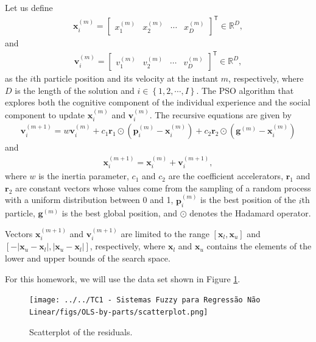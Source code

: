 \documentclass[12pt,a4paper]{article}
\newcommand\abs[1]{\left\lvert#1\right\rvert}
\newcommand{\trans}{\mathsf{T}}
\newcommand{\Real}{\mathbb{R}}
\begin{document}
Let us define
\begin{align}
    \mathbf{x}_i^{(m)} = \begin{bmatrix}
        x_1^{(m)} & x_2^{(m)} & \cdots & x_D^{(m)}
    \end{bmatrix}^\trans \in \Real^D,
\end{align}
and
\begin{align}
    \mathbf{v}_i^{(m)} = \begin{bmatrix}
        v_1^{(m)} & v_2^{(m)} & \cdots & v_D^{(m)}
    \end{bmatrix}^\trans \in \Real^D,
\end{align}
as the \(i\)th particle position and its velocity at the instant \(m\), respectively, where \(D\) is the length of the solution and \(i \in \left\{ 1, 2, \cdots, I \right\}\). The PSO algorithm that explores both the cognitive component of the individual experience and the social component to update \(\mathbf{x}_i^{(m)}\) and \(\mathbf{v}_i^{(m)}\). The recursive equations are given by
\begin{align}
    \mathbf{v}_i^{(m+1)} = w\mathbf{v}_i^{(m)} + c_1 \mathbf{r}_1 \odot \left( \mathbf{p}_i^{(m)} - \mathbf{x}_i^{(m)} \right) + c_2 \mathbf{r}_2 \odot \left( \mathbf{g}^{(m)} - \mathbf{x}_i^{(m)} \right)
    \label{eq:vi-update}
\end{align}
and
\begin{align}
    \mathbf{x}_i^{(m+1)} = \mathbf{x}_i^{(m)} + \mathbf{v}_i^{(m+1)},
    \label{eq:xi-update}
\end{align}
where \(w\) is the inertia parameter, \(c_1\) and \(c_2\) are the coefficient accelerators, \(\mathbf{r}_1\) and \(\mathbf{r}_2\) are constant vectors whose values come from the sampling of a random process with a uniform distribution between 0 and 1, \(\mathbf{p}_i^{(m)}\) is the best position of the \(i\)th particle, \(\mathbf{g}^{(m)}\) is the best global position, and \(\odot\) denotes the Hadamard operator.

Vectors \(\mathbf{x}_i^{(m+1)}\) and \(\mathbf{v}_i^{(m+1)}\) are limited to the range \([\mathbf{x}_l, \mathbf{x}_u]\) and \([-\abs{\mathbf{x}_u-\mathbf{x}_l}, \abs{\mathbf{x}_u-\mathbf{x}_l}]\), respectively, where \(\mathbf{x}_l\) and \(\mathbf{x}_u\) contains the elements of the lower and upper bounds of the search space.

For this homework, we will use the data set shown in Figure \ref{fig:scatter-plot}.
\begin{figure}[H]
    \centering
    \texttt{[image: ../../TC1 - Sistemas Fuzzy para Regressão Não Linear/figs/OLS-by-parts/scatterplot.png]}
    \caption{Scatterplot of the residuals.}
    \label{fig:scatter-plot}
\end{figure}
\end{document}
